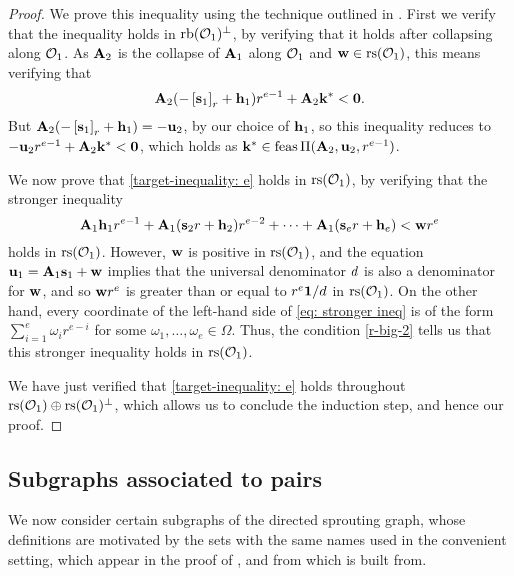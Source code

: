 \documentclass{amsart}
\begin{document}
\begin{proof}
    We prove this inequality using the technique outlined in .
    First we verify that the inequality holds in $\operatorname{rb}(\mathcal{O}_1)^{\perp}$, by verifying that it holds after collapsing along $\mathcal{O}_1$.
    As $\mathbf{A}_2$ is the collapse of $\mathbf{A}_1$ along $\mathcal{O}_1$ and $\mathbf{w}\in \operatorname{rs}(\mathcal{O}_1)$, this means verifying that
    \[\mathbf{A}_2( - \left[ \mathbf{s}_1 \right]_r + \mathbf{h}_1 ) r^{e-1} + \mathbf{A}_2\mathbf{k}^{\ast} < \mathbf{0}.\]
    But $\mathbf{A}_2( - \left[ \mathbf{s}_1 \right]_r + \mathbf{h}_1 ) = -\mathbf{u}_2$, by our choice of $\mathbf{h}_1$, so this inequality reduces to $-\mathbf{u}_2 r^{e-1} + \mathbf{A}_2 \mathbf{k}^{\ast} < \mathbf{0}$, which holds as $\mathbf{k}^{\ast} \in \operatorname{feas} \Pi(\mathbf{A}_2, \mathbf{u}_2, r^{e-1})$.

    We now prove that \eqref{target-inequality: e} holds in $\operatorname{rs}(\mathcal{O}_1)$, by verifying that the stronger inequality
    \begin{equation}
       \mathbf{A}_1 \mathbf{h}_1 r^{e-1} + \mathbf{A}_1 (\mathbf{s}_2 r + \mathbf{h}_2)r^{e-2} + \cdots + \mathbf{A}_1 (\mathbf{s}_e r + \mathbf{h}_e ) < \mathbf{w}r^e
       \label{eq: stronger ineq}
    \end{equation}
    holds in $\operatorname{rs}(\mathcal{O}_1)$.
    However, $\mathbf{w}$ is positive in $\operatorname{rs}(\mathcal{O}_1)$, and the equation $\mathbf{u}_1 = \mathbf{A}_1 \mathbf{s}_1 + \mathbf{w}$ implies that the universal denominator $d$ is also a denominator for $\mathbf{w}$, and so $\mathbf{w} r^e$ is greater than or equal to $r^e \mathbf{1} / d$ in $\operatorname{rs}(\mathcal{O}_1)$.
    On the other hand, every coordinate of the left-hand side of \eqref{eq: stronger ineq} is of the form $\sum_{i=1}^{e} \omega_i  r^{e-i}$ for some $\omega_1, \ldots, \omega_e \in \Omega$.
    Thus, the condition \eqref{r-big-2} tells us that this stronger inequality holds in $\operatorname{rs}(\mathcal{O}_1)$.

    We have just verified that \eqref{target-inequality: e} holds throughout $\operatorname{rs}(\mathcal{O}_1) \oplus \operatorname{rs}(\mathcal{O}_1)^{\perp}$, which allows us to conclude the induction step, and hence our proof.
\end{proof}



\newpage
\subsection{Subgraphs associated to pairs}

We now consider certain subgraphs of the directed sprouting graph, whose definitions are motivated by the sets with the same names used in the convenient setting, which appear in the proof of , and from which  is built from.
\end{document}
